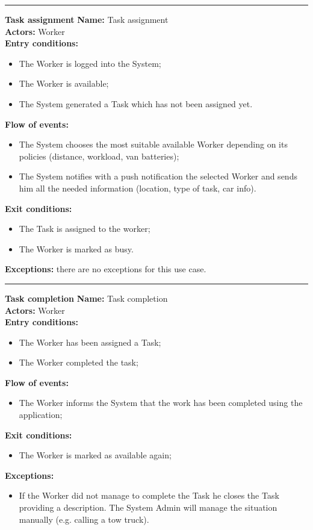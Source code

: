 \begin{center}
\noindent\rule{8cm}{1.0pt}
\end{center}


\textbf{\large Task assignment}
\bigbreak
\textbf{Name:} Task assignment\\
\textbf{Actors:} Worker \\
\textbf{Entry conditions:} 
\begin{itemize}
\item The Worker is logged into the System;
\item The Worker is available;
\item The System generated a Task which has not been assigned yet.
\end{itemize}
\textbf{Flow of events:} 
\begin{itemize}
\item The System chooses the most suitable available Worker depending on its policies (distance, workload, van batteries);
\item The System notifies with a push notification the selected Worker and sends him all the needed information (location, type of task, car info).
\end{itemize}
\textbf{Exit conditions:} 
\begin{itemize}
\item The Task is assigned to the worker;
\item The Worker is marked as busy.
\end{itemize}
\textbf{Exceptions:} there are no exceptions for this use case.\\



\begin{center}
\noindent\rule{8cm}{1.0pt}
\end{center}


\textbf{\large Task completion}
\bigbreak
\textbf{Name:} Task completion\\
\textbf{Actors:} Worker \\
\textbf{Entry conditions:} 
\begin{itemize}
\item The Worker has been assigned a Task;
\item The Worker completed the task;
\end{itemize}
\textbf{Flow of events:} 
\begin{itemize}
\item The Worker informs the System that the work has been completed using the application;
\end{itemize}
\textbf{Exit conditions:} 
\begin{itemize}
\item The Worker is marked as available again;
\end{itemize}
\textbf{Exceptions:} 
\begin{itemize}
\item If the Worker did not manage to complete the Task he closes the Task providing a description. The System Admin will manage the situation manually (e.g. calling a tow truck).
\end{itemize}


